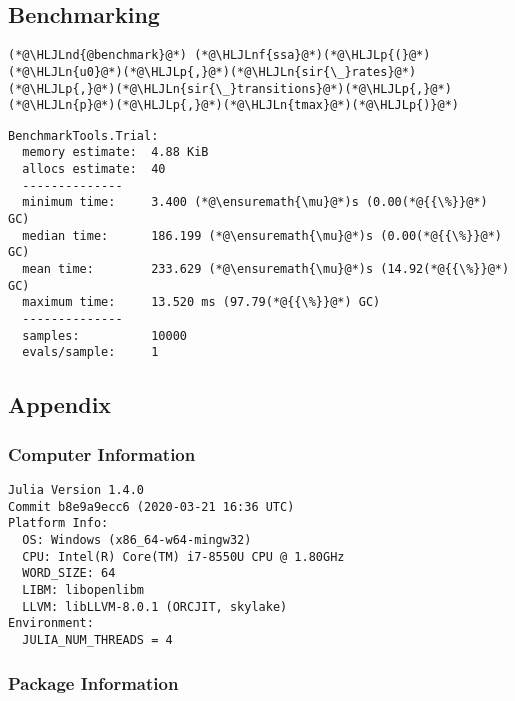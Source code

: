 \documentclass[12pt,a4paper]{article}
\newcommand{\HLJLn}[1]{#1}
\newcommand{\HLJLnd}[1]{\textcolor[RGB]{214,102,97}{#1}}
\newcommand{\HLJLnf}[1]{\textcolor[RGB]{66,102,213}{#1}}
\newcommand{\HLJLp}[1]{#1}
\begin{document}
\subsection{Benchmarking}

\begin{lstlisting}
(*@\HLJLnd{@benchmark}@*) (*@\HLJLnf{ssa}@*)(*@\HLJLp{(}@*)(*@\HLJLn{u0}@*)(*@\HLJLp{,}@*)(*@\HLJLn{sir{\_}rates}@*)(*@\HLJLp{,}@*)(*@\HLJLn{sir{\_}transitions}@*)(*@\HLJLp{,}@*)(*@\HLJLn{p}@*)(*@\HLJLp{,}@*)(*@\HLJLn{tmax}@*)(*@\HLJLp{)}@*)
\end{lstlisting}

\begin{lstlisting}
BenchmarkTools.Trial: 
  memory estimate:  4.88 KiB
  allocs estimate:  40
  --------------
  minimum time:     3.400 (*@\ensuremath{\mu}@*)s (0.00(*@{{\%}}@*) GC)
  median time:      186.199 (*@\ensuremath{\mu}@*)s (0.00(*@{{\%}}@*) GC)
  mean time:        233.629 (*@\ensuremath{\mu}@*)s (14.92(*@{{\%}}@*) GC)
  maximum time:     13.520 ms (97.79(*@{{\%}}@*) GC)
  --------------
  samples:          10000
  evals/sample:     1
\end{lstlisting}



\subsection{Appendix}

\subsubsection{Computer Information}

\begin{verbatim}
Julia Version 1.4.0
Commit b8e9a9ecc6 (2020-03-21 16:36 UTC)
Platform Info:
  OS: Windows (x86_64-w64-mingw32)
  CPU: Intel(R) Core(TM) i7-8550U CPU @ 1.80GHz
  WORD_SIZE: 64
  LIBM: libopenlibm
  LLVM: libLLVM-8.0.1 (ORCJIT, skylake)
Environment:
  JULIA_NUM_THREADS = 4

\end{verbatim}

\subsubsection{Package Information}
\end{document}
